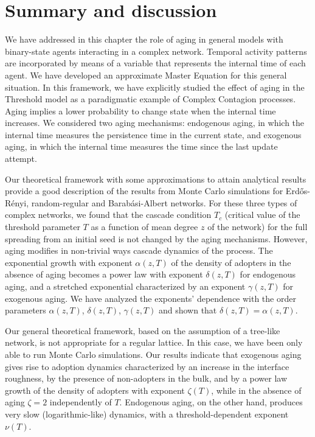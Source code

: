 \section{\label{sec:Summary and Conclusions} Summary and discussion}

We have addressed in this chapter the role of aging in general models with binary-state agents interacting in a complex network. Temporal activity patterns are incorporated by means of a variable that represents the internal time of each agent. We have developed an approximate Master Equation for this general situation. In this framework, we have explicitly studied the effect of aging in the Threshold model as a paradigmatic example of Complex Contagion processes. Aging implies a lower probability to change state when the internal time increases. We considered  two aging mechanisms: endogenous aging, in which the internal time measures the persistence time in the current state, and exogenous aging, in which the internal time measures the time since the last update attempt.


Our theoretical framework with some approximations to attain analytical results provide a good description of the results from Monte Carlo simulations for Erd\H{o}s-R\'enyi, random-regular and Barab\'asi-Albert networks. For these three types of complex networks, we found that the cascade condition $T_c$ (critical value of the threshold parameter $T$ as a function of mean degree $z$ of the network) for the full spreading from an initial seed is not changed by the aging mechanisms. However, aging modifies in non-trivial ways cascade dynamics of the process. The exponential growth with exponent $\alpha(z,T)$ of the density of adopters in the absence of aging becomes a power law with exponent $\delta(z,T)$ for endogenous aging, and a stretched exponential characterized by an exponent $\gamma(z,T)$ for exogenous aging. We have analyzed the exponents' dependence with the order parameters $\alpha(z,T)$, $\delta(z,T)$, $\gamma(z,T)$ and shown that $\delta(z,T)=\alpha(z,T)$.

Our general theoretical framework, based on the assumption of a tree-like network, is not appropriate for a regular lattice. In this case, we have been only able to run Monte Carlo simulations. Our results indicate that  exogenous aging gives rise to adoption dynamics characterized by an increase in the interface roughness, by the presence of non-adopters in the bulk, and by a power law growth of  the density of adopters with exponent $\zeta (T)$, while in the absence of aging $\zeta = 2$ independently of $T$. Endogenous aging, on the other hand, produces very slow (logarithmic-like) dynamics, with a threshold-dependent exponent $\nu(T)$.
 
